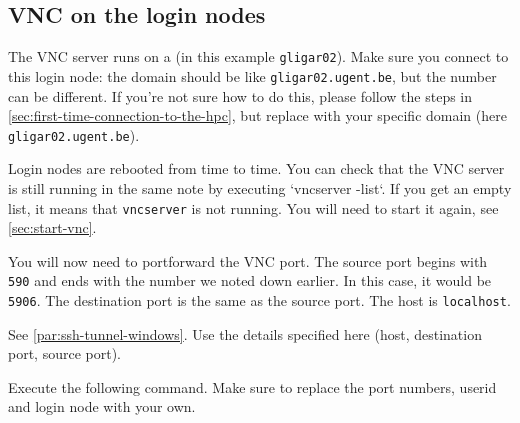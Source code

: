 \subsection{VNC on the login nodes}

The VNC server runs on a  (in this example \lstinline|gligar02|).
Make sure you connect to this login node: the domain should be like \lstinline|gligar02.ugent.be|,
but the number can be different. If you're not sure how to do this, please follow the steps
in \autoref{sec:first-time-connection-to-the-hpc}, but replace \loginnode with your specific
domain (here \lstinline|gligar02.ugent.be|).

Login nodes are rebooted from time to time. You can check that the VNC server is still
running in the same note by executing `vncserver -list`. If you get an empty list,
it means that \lstinline|vncserver| is not running. You will need to start it again,
see \autoref{sec:start-vnc}.

You will now need to portforward the VNC port. The source port begins with \lstinline|590|
and ends with the number we noted down earlier. In this case, it would be \lstinline|5906|.
The destination port is the same as the source port. The host is \lstinline|localhost|.

\ifwindows
See \autoref{par:ssh-tunnel-windows}. Use the details specified here (host, destination port,
source port).
\else

Execute the following command. Make sure to replace the port numbers, userid and login node
with your own.

\begin{prompt}
\end{prompt}
\fi
